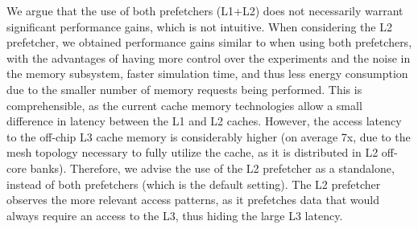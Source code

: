 \documentclass[AMA,final,STIX1COL]{WileyNJD-v2}
\begin{document}
We argue that the use of both prefetchers (L1+L2) does not necessarily warrant significant performance gains, which is not intuitive.
When considering the L2 prefetcher, we obtained performance gains similar to when using both prefetchers, with the advantages of having more control over the experiments and the noise in the memory subsystem, faster simulation time, and thus less energy consumption due to the smaller number of memory requests being performed. 
This is comprehensible, as the current cache memory technologies allow a small difference in latency between the L1 and L2 caches.
However, the access latency to the off-chip L3 cache memory is considerably higher (on average 7x, due to the mesh topology necessary to fully utilize the cache, as it is distributed in L2 off-core banks). 
Therefore, we advise the use of the L2 prefetcher as a standalone, instead of both prefetchers (which is the default setting).
The L2 prefetcher observes the more relevant access patterns, as it prefetches data that would always require an access to the L3, thus hiding the large L3 latency.
\end{document}
